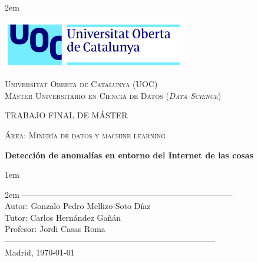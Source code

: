 \newpage
\thispagestyle{empty}

\baselineskip 2em


\centerline{\includegraphics[width=0.6\textwidth]{images/UOC-logo}}
\begin{center}
\textsc{Universitat Oberta de Catalunya (UOC) \\
 Máster Universitario en Ciencia de Datos (\textit{Data Science})\\}


\vspace*{1.5cm}

\textsc{\Large TRABAJO FINAL DE MÁSTER}

\vspace*{0.5cm}

\textsc{\large Área: Minería de datos y machine learning}



\vspace*{2.0cm}

\textbf{\Large Detección de anomalías en entorno del Internet de las cosas}


\vspace{2.5cm}
\baselineskip 1em

\baselineskip 2em
-----------------------------------------------------------------------------\\
Autor:      Gonzalo Pedro Mellizo-Soto Díaz\\
Tutor:      Carlos Hernández Gañán \\
Profesor:   Jordi Casas Roma \\
-----------------------------------------------------------------------------\\
\vspace*{1.5cm}
Madrid, \today

\end{center}

\newpage
\pagestyle{empty}
\hfill
